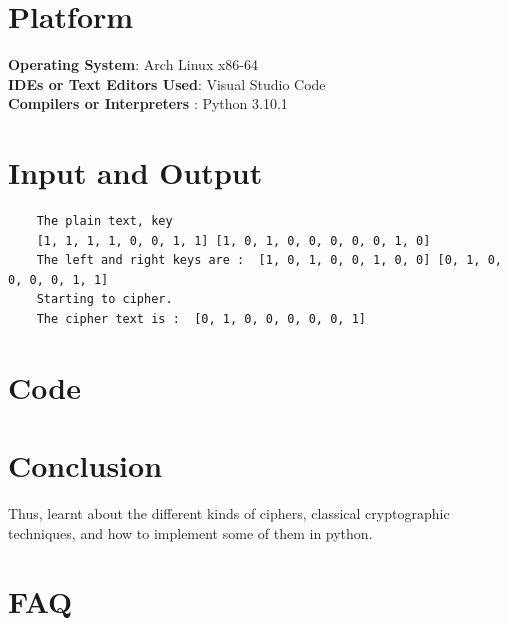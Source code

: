 \documentclass[11pt]{article}
\begin{document}
\section{Platform}
\textbf{Operating System}: Arch Linux x86-64 \\
\textbf{IDEs or Text Editors Used}: Visual Studio Code\\
\textbf{Compilers or Interpreters} : Python 3.10.1\\

\section{Input and Output}
\begin{verbatim}
    The plain text, key
    [1, 1, 1, 1, 0, 0, 1, 1] [1, 0, 1, 0, 0, 0, 0, 0, 1, 0]
    The left and right keys are :  [1, 0, 1, 0, 0, 1, 0, 0] [0, 1, 0, 0, 0, 0, 1, 1]
    Starting to cipher. 
    The cipher text is :  [0, 1, 0, 0, 0, 0, 0, 1]
\end{verbatim}
\section{Code}


\section{Conclusion}
Thus, learnt about the different kinds of ciphers, classical cryptographic techniques, and how to implement some of them in python.
\clearpage

\section{FAQ}
\end{document}
